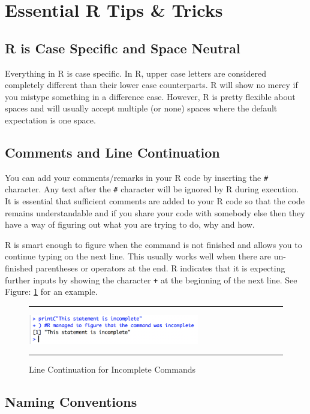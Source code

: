 \documentclass[10pt, letterpaper, twoside]{memoir}\usepackage{knitr}
\begin{document}
\section{Essential R Tips \& Tricks}

\subsection{R is Case Specific and Space Neutral}

Everything in R is case specific. In R, upper case letters are considered completely different than their lower case counterparts. R will show no mercy if you mistype something in a difference case. However, R is pretty flexible about spaces and will usually accept multiple (or none) spaces where the default expectation is one space. 

\subsection{Comments and Line Continuation}

You can add your comments/remarks in your R code by inserting the \verb|#| character. Any text after the \verb|#| character will be ignored by R during execution. It is essential that sufficient comments are added to your R code so that the code remains understandable and if you share your code with somebody else then they have a way of figuring out what you are trying to do, why and how.

R is smart enough to figure when the command is not finished and allows you to continue typing on the next line. This usually works well when there are un-finished parentheses or operators at the end. R indicates that it is expecting further inputs by showing the character \texttt{+} at the beginning of the next line. See Figure: \ref{fig:incomplete} for an example.

\begin{figure}
\rule{4in}{1pt}
\centering
\includegraphics[height=0.5in]{images/incomplete.png}
\caption{Line Continuation for Incomplete Commands}
\label{fig:incomplete}
\rule{4in}{1pt}
\end{figure}

\subsection{Naming Conventions}
\end{document}
